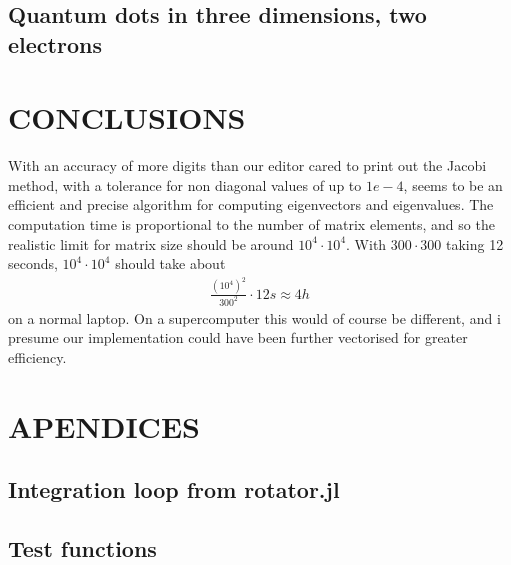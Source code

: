 \documentclass[a4paper]{article}
\begin{document}
\subsection{Quantum dots in three dimensions, two electrons}


\section{CONCLUSIONS}
With an accuracy of more digits than our editor cared to print out the Jacobi method, with a tolerance for non diagonal values of up to $1e-4$, seems to be an efficient and precise algorithm for computing eigenvectors and eigenvalues. The computation time is proportional to the number of matrix elements, and so the realistic limit for matrix size should be around $10^4 \cdot 10^4$. With $300 \cdot 300$ taking 12 seconds, $10^4 \cdot 10^4$ should take about
\begin{align}
\frac{(10^4)^2}{300^2}\cdot 12s\approx 4h
\end{align}
on a normal laptop. On a supercomputer this would of course be different, and i presume our implementation could have been further vectorised for greater efficiency.


\section{APENDICES}
\subsection{Integration loop from rotator.jl}\label{rotator.jl}


\subsection{Test functions}\label{opp_c.jl}

\end{document}
